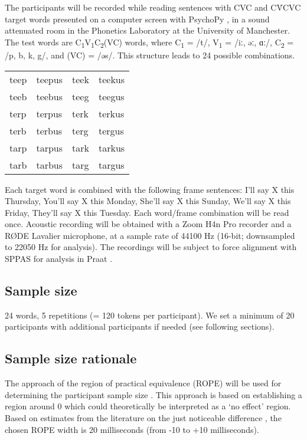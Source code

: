 \documentclass[11pt,]{article}
\begin{document}
\label{s:procedure}

The participants will be recorded while reading sentences with CVC and
CV́CVC target words presented on a computer screen with PsychoPy
\citep{peirce2009}, in a sound attenuated room in the Phonetics
Laboratory at the University of Manchester. The test words are
C\textsubscript{1}V\textsubscript{1}C\textsubscript{2}(VC) words, where
C\textsubscript{1} = /t/, V\textsubscript{1} = /iː, əː, ɑː/,
C\textsubscript{2} = /p, b, k, g/, and (VC) = /əs/. This structure leads
to 24 possible combinations.

\begin{tabular}{llll}
teep & teepus & teek & teekus \\
teeb & teebus & teeg & teegus \\
terp & terpus & terk & terkus \\
terb & terbus & terg & tergus \\
tarp & tarpus & tark & tarkus \\
tarb & tarbus & targ & targus \\
\end{tabular}

Each target word is combined with the following frame sentences: I'll
say X this Thursday, You'll say X this Monday, She'll say X this Sunday,
We'll say X this Friday, They'll say X this Tuesday. Each word/frame
combination will be read once. Acoustic recording will be obtained with
a Zoom H4n Pro recorder and a RØDE Lavalier microphone, at a sample rate
of 44100 Hz (16-bit; downsampled to 22050 Hz for analysis). The
recordings will be subject to force alignment with SPPAS
\citep{bigi2015} for analysis in Praat \citep{boersma2018}.

\hypertarget{sample-size}{%
\subsection{Sample size}\label{sample-size}}

24 words, 5 repetitions (= 120 tokens per participant). We set a minimum
of 20 participants with additional participants if needed (see following
sections).

\hypertarget{sample-size-rationale}{%
\subsection{Sample size rationale}\label{sample-size-rationale}}

The approach of the region of practical equivalence (ROPE) will be used
for determining the participant sample size
\citep{kruschke2015, vasishth2018a}. This approach is based on
establishing a region around 0 which could theoretically be interpreted
as a `no effect' region. Based on estimates from the literature on the
just noticeable difference \citep{huggins1972, nooteboom1980}, the
chosen ROPE width is 20 milliseconds (from -10 to +10 milliseconds).
\end{document}
